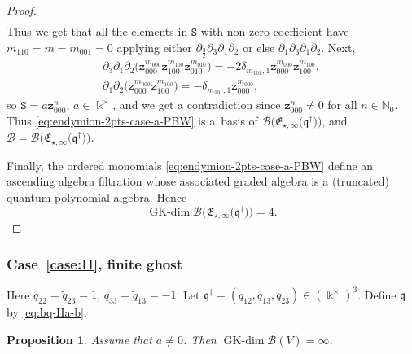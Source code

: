 \documentclass[pdftex]{sigma}
\numberwithin{equation}{section}
\newtheorem{Proposition}[Theorem]{Proposition}
 { \theoremstyle{definition}
\newtheorem{Definition}[Theorem]{Definition}
\newtheorem{Note}[Theorem]{Note}
\newtheorem{Example}[Theorem]{Example}
\newtheorem{Remark}[Theorem]{Remark} }
\newcommand{\GK}{\operatorname{GK-dim}}
\newcommand{\toba}{\mathscr B}
\newcommand{\zt}{\mathtt{z}}
\newcommand{\eny}{\mathfrak{E}}
\newcommand{\enyIIb}[1]{\eny_{\star,#1}}
\newcommand{\bq}{\mathfrak{q}}
\newcommand{\bqs}{\bq^{\dagger}}
\newcommand{\tresdos}{\frac{3}{2}}
\begin{document}
\begin{proof}
\begin{gather*}
\end{gather*}
Thus we get that all the elements in $\mathtt{S}$ with non-zero coefficient have $m_{110}=m=m_{001}=0$
applying either $\partial_{\tresdos}\partial_3\partial_1\partial_2$ or else $\partial_1\partial_3\partial_1\partial_2$. Next,
\begin{gather*}
 \partial_3\partial_1\partial_2\big(\zt_{000}^{m_{000}} \zt_{100}^{m_{100}} \zt_{010}^{m_{010}}\big)
=-2\delta_{m_{101},1} \zt_{000}^{m_{000}} \zt_{100}^{m_{100}},
\\[1mm]
 \partial_1\partial_2\big(\zt_{000}^{m_{000}} \zt_{100}^{m_{100}}\big)
=-\delta_{m_{101},1} \zt_{000}^{m_{000}},
\end{gather*}
so $\mathtt{S}=a \zt_{000}^n$, $a\in\Bbbk^{\times}$, and we get a contradiction since $\zt_{000}^n\ne0$ for all $n\in\mathbb N_0$. Thus \eqref{eq:endymion-2pts-case-a-PBW} is a~basis of $\toba\big(\enyIIb{\infty}\big(\bqs\big)\big)$, and $\toba=\toba\big(\enyIIb{\infty}\big(\bqs\big)\big)$.

Finally, the ordered monomials \eqref{eq:endymion-2pts-case-a-PBW} define an ascending algebra filtration whose associated graded algebra is a
(truncated) quantum polynomial algebra. Hence
\begin{equation*}
\GK \toba\big(\enyIIb{\infty}\big(\bqs\big)\big) =4.
\tag*{\qed}
\end{equation*}
\renewcommand{\qed}{}
\end{proof}

\subsubsection[Case (II), finite ghost]{Case~\ref{case:II}, finite ghost}\label{subsubsec:caseII-2}
Here
$q_{22} = \widetilde{q}_{23} = 1$, $q_{33} = \widetilde{q}_{13}=-1$.
Let $\bqs = (q_{12}, q_{13}, q_{23}) \in (\Bbbk^{\times})^3$. Define
$\bq$ by \eqref{eq:bq-IIa-b}.



\begin{Proposition} \label{prop:endymion-two-pts-case-b}
Assume that $a\ne 0$. Then $\GK \toba(V)=\infty$.
\end{Proposition}
\end{document}
